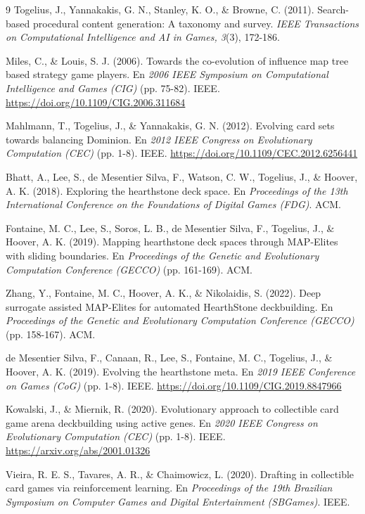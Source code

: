 \begin{thebibliography}{9}
Togelius, J., Yannakakis, G. N., Stanley, K. O., \& Browne, C. (2011). Search-based procedural content generation: A taxonomy and survey. \textit{IEEE Transactions on Computational Intelligence and AI in Games, 3}(3), 172-186.

Miles, C., \& Louis, S. J. (2006). Towards the co-evolution of influence map tree based strategy game players. En \textit{2006 IEEE Symposium on Computational Intelligence and Games (CIG)} (pp. 75-82). IEEE. \url{https://doi.org/10.1109/CIG.2006.311684}

Mahlmann, T., Togelius, J., \& Yannakakis, G. N. (2012). Evolving card sets towards balancing Dominion. En \textit{2012 IEEE Congress on Evolutionary Computation (CEC)} (pp. 1-8). IEEE. \url{https://doi.org/10.1109/CEC.2012.6256441}

Bhatt, A., Lee, S., de Mesentier Silva, F., Watson, C. W., Togelius, J., \& Hoover, A. K. (2018). Exploring the hearthstone deck space. En \textit{Proceedings of the 13th International Conference on the Foundations of Digital Games (FDG)}. ACM.

Fontaine, M. C., Lee, S., Soros, L. B., de Mesentier Silva, F., Togelius, J., \& Hoover, A. K. (2019). Mapping hearthstone deck spaces through MAP-Elites with sliding boundaries. En \textit{Proceedings of the Genetic and Evolutionary Computation Conference (GECCO)} (pp. 161-169). ACM.

Zhang, Y., Fontaine, M. C., Hoover, A. K., \& Nikolaidis, S. (2022). Deep surrogate assisted MAP-Elites for automated HearthStone deckbuilding. En \textit{Proceedings of the Genetic and Evolutionary Computation Conference (GECCO)} (pp. 158-167). ACM.

de Mesentier Silva, F., Canaan, R., Lee, S., Fontaine, M. C., Togelius, J., \& Hoover, A. K. (2019). Evolving the hearthstone meta. En \textit{2019 IEEE Conference on Games (CoG)} (pp. 1-8). IEEE. \url{https://doi.org/10.1109/CIG.2019.8847966}

Kowalski, J., \& Miernik, R. (2020). Evolutionary approach to collectible card game arena deckbuilding using active genes. En \textit{2020 IEEE Congress on Evolutionary Computation (CEC)} (pp. 1-8). IEEE. \url{https://arxiv.org/abs/2001.01326}

Vieira, R. E. S., Tavares, A. R., \& Chaimowicz, L. (2020). Drafting in collectible card games via reinforcement learning. En \textit{Proceedings of the 19th Brazilian Symposium on Computer Games and Digital Entertainment (SBGames)}. IEEE.


\end{thebibliography}
